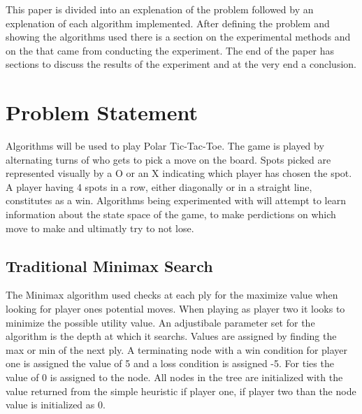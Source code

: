 \documentclass[12pt,letterpaper]{article}
\begin{document}
This paper is divided into an explenation of the problem followed by an explenation of each algorithm implemented. After defining the problem and showing the algorithms used there is a section on the experimental methods and on the that came from conducting the experiment. The end of the paper has sections to discuss the results of the experiment and at the very end a conclusion.


\section{Problem Statement}
Algorithms will be used to play Polar Tic-Tac-Toe. The game is played by alternating turns of who gets to pick a move on the board. Spots picked are represented visually by a O or an X indicating which player has chosen the spot. A player having 4 spots in a row, either diagonally or in a straight line, constitutes as a win. Algorithms being experimented with will attempt to learn information about the state space of the game, to make perdictions on which move to make and ultimatly try to not lose.

\subsection{Traditional Minimax Search}
The Minimax algorithm used checks at each ply for the maximize value when looking for player ones potential moves. When playing as player two it looks to minimize the possible utility value. An adjustibale parameter set for the algorithm is the depth at which it searchs. Values are assigned by finding the max or min of the next ply. A terminating node with a win condition for player one is assigned the value of 5 and a loss condition is assigned -5. For ties the value of 0 is assigned to the node. All nodes in the tree are initialized with the value returned from the simple heuristic if player one, if player two than the node value is initialized as 0. 
\end{document}
